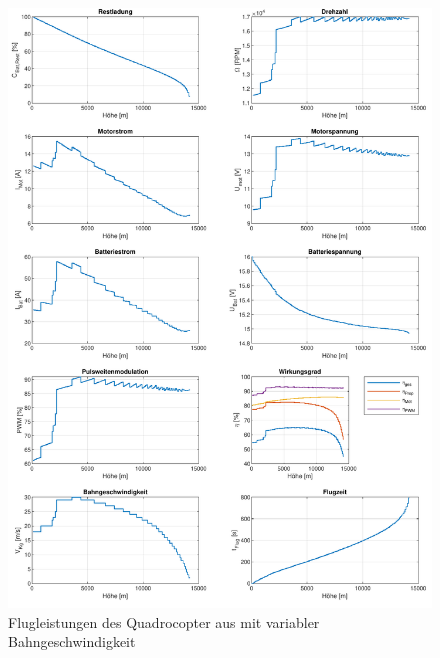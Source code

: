 \begin{figure}[htb!]
\centering
	\includegraphics[scale=0.7]{Diagramme/Russland_vvar.pdf}
	\caption{Flugleistungen des Quadrocopter aus \cite{Anderson.2018} mit variabler Bahngeschwindigkeit}
	\label{abb:russland_vvar}
\end{figure}



